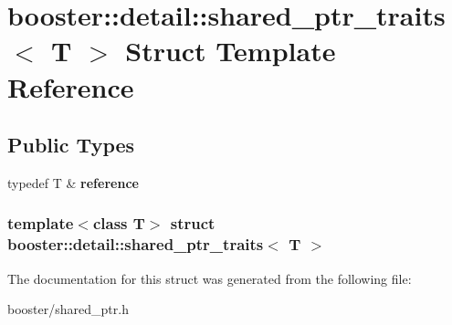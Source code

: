 \section{booster\-:\-:detail\-:\-:shared\-\_\-ptr\-\_\-traits$<$ \-T $>$ \-Struct \-Template \-Reference}
\label{structbooster_1_1detail_1_1shared__ptr__traits}
\subsection*{\-Public \-Types}
\begin{DoxyCompactItemize}
\item 
typedef \-T \& {\bfseries reference}\label{structbooster_1_1detail_1_1shared__ptr__traits_a74ce07cf17d9ca8b9f09dcd2e9b7ca28}

\end{DoxyCompactItemize}
\subsubsection*{template$<$class \-T$>$ struct booster\-::detail\-::shared\-\_\-ptr\-\_\-traits$<$ T $>$}



\-The documentation for this struct was generated from the following file\-:\begin{DoxyCompactItemize}
\item 
booster/shared\-\_\-ptr.\-h\end{DoxyCompactItemize}
